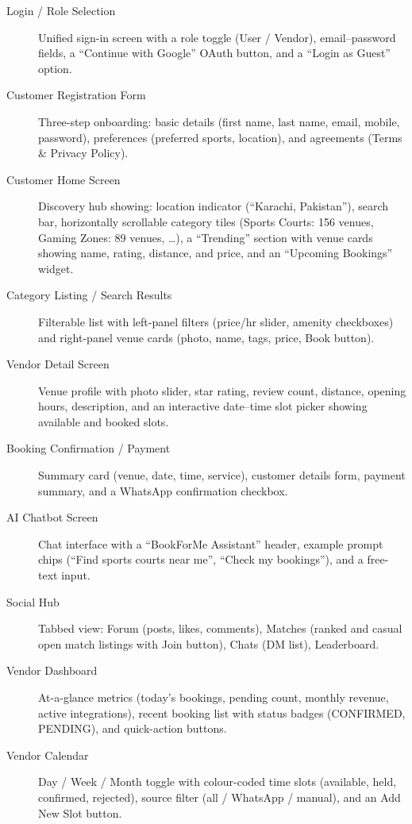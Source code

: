 \begin{description}
  \item[Login / Role Selection]
        Unified sign-in screen with a role toggle (User / Vendor), email--password
        fields, a ``Continue with Google'' OAuth button, and a ``Login as Guest''
        option.

  \item[Customer Registration Form]
        Three-step onboarding: basic details (first name, last name, email, mobile,
        password), preferences (preferred sports, location), and agreements
        (Terms \& Privacy Policy).

  \item[Customer Home Screen]
        Discovery hub showing: location indicator (``Karachi, Pakistan''), search bar,
        horizontally scrollable category tiles (Sports Courts: 156 venues, Gaming
        Zones: 89 venues, \ldots), a ``Trending'' section with venue cards showing
        name, rating, distance, and price, and an ``Upcoming Bookings'' widget.

  \item[Category Listing / Search Results]
        Filterable list with left-panel filters (price/hr slider, amenity checkboxes)
        and right-panel venue cards (photo, name, tags, price, Book button).

  \item[Vendor Detail Screen]
        Venue profile with photo slider, star rating, review count, distance, opening
        hours, description, and an interactive date--time slot picker showing available
        and booked slots.

  \item[Booking Confirmation / Payment]
        Summary card (venue, date, time, service), customer details form, payment
        summary, and a WhatsApp confirmation checkbox.

  \item[AI Chatbot Screen]
        Chat interface with a ``BookForMe Assistant'' header, example prompt chips
        (``Find sports courts near me'', ``Check my bookings''), and a free-text
        input.

  \item[Social Hub]
        Tabbed view: Forum (posts, likes, comments), Matches (ranked and casual open
        match listings with Join button), Chats (DM list), Leaderboard.

  \item[Vendor Dashboard]
        At-a-glance metrics (today's bookings, pending count, monthly revenue, active
        integrations), recent booking list with status badges (CONFIRMED, PENDING),
        and quick-action buttons.

  \item[Vendor Calendar]
        Day / Week / Month toggle with colour-coded time slots (available, held,
        confirmed, rejected), source filter (all / WhatsApp / manual), and an
        Add New Slot button.

\end{description}

